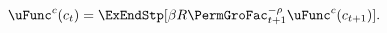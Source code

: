   \begin{equation}\begin{gathered}\begin{aligned}
        \uFunc^{c}(c_{\prd})  & = \ExEndStp[\DiscFac\Rfree \PermGroFac_{\prd+1}^{-\CRRA}\uFunc^{c}(c_{\prd+1})] \label{eq:cEuler}.
      \end{aligned}\end{gathered}\end{equation}
